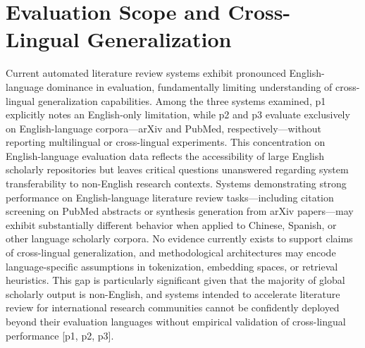 \documentclass{article}
\begin{document}
\section{Evaluation Scope and Cross-Lingual Generalization}
Current automated literature review systems exhibit pronounced English-language dominance in evaluation, fundamentally limiting understanding of cross-lingual generalization capabilities. Among the three systems examined, p1 explicitly notes an English-only limitation, while p2 and p3 evaluate exclusively on English-language corpora—arXiv and PubMed, respectively—without reporting multilingual or cross-lingual experiments. This concentration on English-language evaluation data reflects the accessibility of large English scholarly repositories but leaves critical questions unanswered regarding system transferability to non-English research contexts. Systems demonstrating strong performance on English-language literature review tasks—including citation screening on PubMed abstracts or synthesis generation from arXiv papers—may exhibit substantially different behavior when applied to Chinese, Spanish, or other language scholarly corpora. No evidence currently exists to support claims of cross-lingual generalization, and methodological architectures may encode language-specific assumptions in tokenization, embedding spaces, or retrieval heuristics. This gap is particularly significant given that the majority of global scholarly output is non-English, and systems intended to accelerate literature review for international research communities cannot be confidently deployed beyond their evaluation languages without empirical validation of cross-lingual performance [p1, p2, p3].
\end{document}
